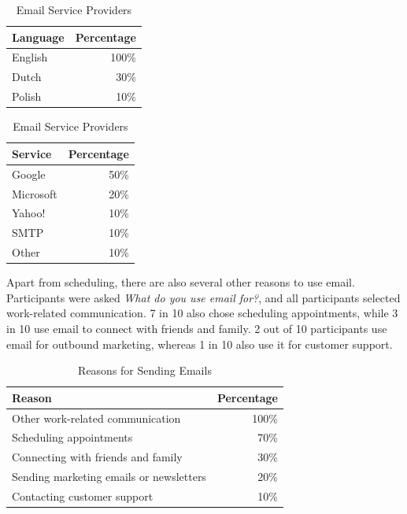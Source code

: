\documentclass{article}
\begin{document}
\begin{table}[!htb]
	\begin{minipage}{.5\linewidth}
		\caption{Email Languages}
		\centering
		\begin{tabular}{lr}
			\hline
			\textbf{Language} & \textbf{Percentage} \\
			\hline
			English           & 100\%               \\
			Dutch             & 30\%                \\
			Polish            & 10\%                \\
			\hline
		\end{tabular}
	\end{minipage}%
	\hspace{.1cm}
	\begin{minipage}{.5\linewidth}
		\centering
		\caption{Email Service Providers}
		\begin{tabular}{lr}
			\hline
			\textbf{Service} & \textbf{Percentage} \\
			\hline
			Google           & 50\%                \\
			Microsoft        & 20\%                \\
			Yahoo!           & 10\%                \\
			SMTP             & 10\%                \\
			Other            & 10\%                \\
			\hline
		\end{tabular}
	\end{minipage} 
\end{table}

Apart from scheduling, there are also several other reasons to use email. Participants were asked \emph{What do you use email for?}, and all participants selected work-related communication. 7 in 10 also chose scheduling appointments, while 3 in 10 use email to connect with friends and family. 2 out of 10 participants use email for outbound marketing, whereas 1 in 10 also use it for customer support.

\begin{table}[!htb]
	\begin{minipage}{1\linewidth}
		\caption{Reasons for Sending Emails}
		\centering
		\begin{tabular}{lr}
			\hline
			\textbf{Reason}                         & \textbf{Percentage} \\
			\hline
			Other work-related communication        & 100\%               \\
			Scheduling appointments                 & 70\%                \\
			Connecting with friends and family      & 30\%                \\
			Sending marketing emails or newsletters & 20\%                \\
			Contacting customer support             & 10\%                \\
			\hline
		\end{tabular}
	\end{minipage}%
\end{table}
\end{document}
